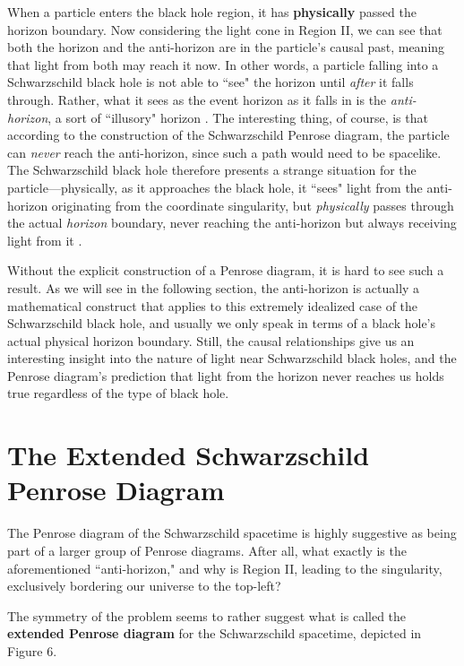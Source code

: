 \documentclass{article}
\begin{document}
When a particle enters the black hole region, it has \textbf{physically} passed the horizon boundary. Now considering the light cone in Region II, we can see that both the horizon and the anti-horizon are in the particle's causal past, meaning that light from both may reach it now. In other words, a particle falling into a Schwarzschild black hole is not able to ``see" the horizon until \textit{after} it falls through. Rather, what it sees as the event horizon as it falls in is the \textit{anti-horizon}, a sort of ``illusory" horizon \cite{penrose_colorado}. The interesting thing, of course, is that according to the construction of the Schwarzschild Penrose diagram, the particle can \textit{never} reach the anti-horizon, since such a path would need to be spacelike. The Schwarzschild black hole therefore presents a strange situation for the particle---physically, as it approaches the black hole, it ``sees" light from the anti-horizon originating from the coordinate singularity, but \textit{physically} passes through the actual \textit{horizon} boundary, never reaching the anti-horizon but always receiving light from it \cite{penrose_colorado}.

Without the explicit construction of a Penrose diagram, it is hard to see such a result. As we will see in the following section, the anti-horizon is actually a mathematical construct that applies to this extremely idealized case of the Schwarzschild black hole, and usually we only speak in terms of a black hole's actual physical horizon boundary. Still, the causal relationships give us an interesting insight into the nature of light near Schwarzschild black holes, and the Penrose diagram's prediction that light from the horizon never reaches us holds true regardless of the type of black hole.


\section{The Extended Schwarzschild Penrose Diagram}

The Penrose diagram of the Schwarzschild spacetime is highly suggestive as being part of a larger group of Penrose diagrams. After all, what exactly is the aforementioned ``anti-horizon," and why is Region II, leading to the singularity, exclusively bordering our universe to the top-left? 

The symmetry of the problem seems to rather suggest what is called the \textbf{extended Penrose diagram} for the Schwarzschild spacetime, depicted in Figure 6.
\end{document}
